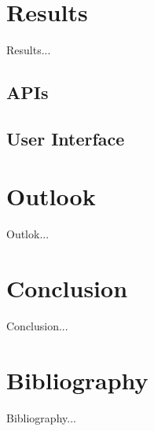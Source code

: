 \documentclass[a4paper, 12pt, headsepline]{scrartcl}
\begin{document}
\section{Results}
Results...

\subsection{APIs}


\subsection{User Interface}

\section{Outlook}
Outlok...

\section{Conclusion}
Conclusion...

\section{Bibliography}
Bibliography...
\end{document}
